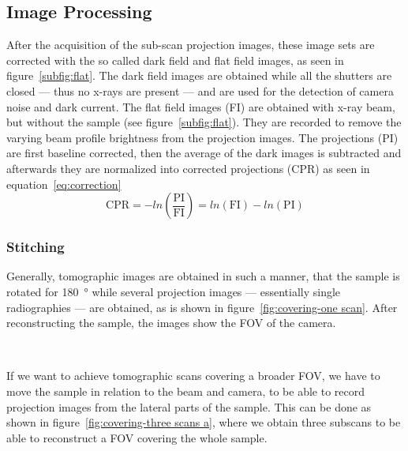 \subsection{Image Processing}
\label{subsec:image processing}
After the acquisition of the sub-scan projection images, these image sets are corrected with the so called dark field and flat field images, as seen in figure~\ref{subfig:flat}. The dark field images are obtained while all the shutters are closed --- thus no x-rays are present --- and are used for the detection of camera noise and dark current. The flat field images (FI) are obtained with x-ray beam, but without the sample (see figure~\ref{subfig:flat}). They are recorded to remove the varying beam profile brightness from the projection images. The projections (PI) are first baseline corrected, then the average of the dark images is subtracted and afterwards they are normalized into corrected projections (CPR) as seen in equation~\ref{eq:correction}
\begin{equation}
\text{CPR}=-ln\left(\frac{\text{PI}}{\text{FI}}\right)=ln(\text{FI})-ln(\text{PI})
\label{eq:correction}
\end{equation}

\subsubsection{Stitching}
\label{subsec:stitching}
Generally, tomographic images are obtained in such a manner, that the sample is rotated for \SI{180}{\degree} while several projection images --- essentially single radiographies --- are obtained, as is shown in figure~\ref{fig:covering-one scan}. After reconstructing the sample, the images show the FOV of the camera.

\begin{figure*}[tb]
	\centering
	\subfloat[\SI{180}{\degree}]{\label{subfig:cover180}}\\
	\subfloat[\SI{360}{\degree}]{\label{subfig:cover360}}
	\caption{Covering the FOV -- one scan}
	\label{fig:covering-one scan}
\end{figure*}

If we want to achieve tomographic scans covering a broader FOV, we have to move the sample in relation to the beam and camera, to be able to record projection images from the lateral parts of the sample. This can be done as shown in figure~\ref{fig:covering-three scans a}, where we obtain three subscans to be able to reconstruct a FOV covering the whole sample.

